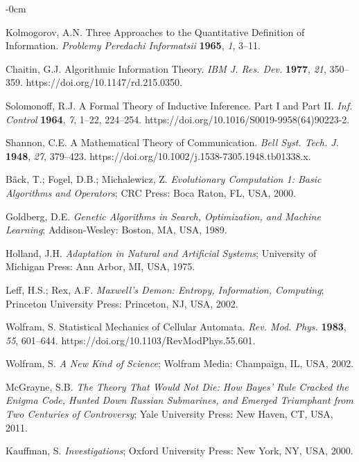 \documentclass[entropy,article,submit,pdftex,moreauthors]{Definitions/mdpi}
\begin{document}
\begin{adjustwidth}{-\extralength}{0cm}
\begin{thebibliography}{999}
Kolmogorov, A.N. Three Approaches to the Quantitative Definition of Information. \textit{Problemy Peredachi Informatsii} \textbf{1965}, \textit{1}, 3–11.

Chaitin, G.J. Algorithmic Information Theory. \textit{IBM J. Res. Dev.} \textbf{1977}, \textit{21}, 350–359. https://doi.org/10.1147/rd.215.0350.

Solomonoff, R.J. A Formal Theory of Inductive Inference. Part I and Part II. \textit{Inf. Control} \textbf{1964}, \textit{7}, 1–22, 224–254. https://doi.org/10.1016/S0019-9958(64)90223-2.


Shannon, C.E. A Mathematical Theory of Communication. \textit{Bell Syst. Tech. J.} \textbf{1948}, \textit{27}, 379–423. https://doi.org/10.1002/j.1538-7305.1948.tb01338.x.

Bäck, T.; Fogel, D.B.; Michalewicz, Z. \textit{Evolutionary Computation 1: Basic Algorithms and Operators}; CRC Press: Boca Raton, FL, USA, 2000.

Goldberg, D.E. \textit{Genetic Algorithms in Search, Optimization, and Machine Learning}; Addison-Wesley: Boston, MA, USA, 1989.

Holland, J.H. \textit{Adaptation in Natural and Artificial Systems}; University of Michigan Press: Ann Arbor, MI, USA, 1975.

Leff, H.S.; Rex, A.F. \textit{Maxwell’s Demon: Entropy, Information, Computing}; Princeton University Press: Princeton, NJ, USA, 2002.

Wolfram, S. Statistical Mechanics of Cellular Automata. \textit{Rev. Mod. Phys.} \textbf{1983}, \textit{55}, 601–644. https://doi.org/10.1103/RevModPhys.55.601.

Wolfram, S. \textit{A New Kind of Science}; Wolfram Media: Champaign, IL, USA, 2002.

McGrayne, S.B. \textit{The Theory That Would Not Die: How Bayes' Rule Cracked the Enigma Code, Hunted Down Russian Submarines, and Emerged Triumphant from Two Centuries of Controversy}; Yale University Press: New Haven, CT, USA, 2011.

Kauffman, S. \textit{Investigations}; Oxford University Press: New York, NY, USA, 2000.


\end{thebibliography}
\end{adjustwidth}
\end{document}

